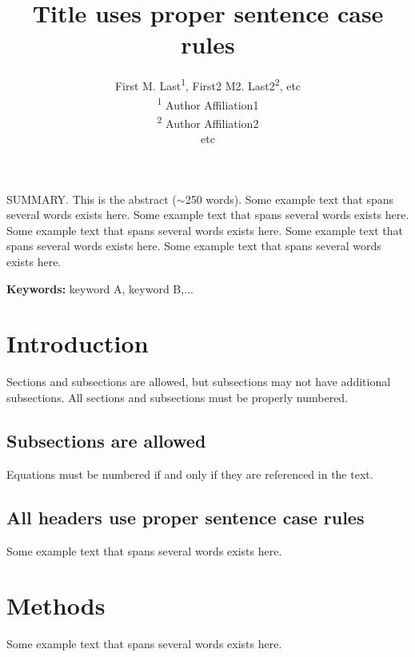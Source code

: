 \documentclass[10pt,fleqn]{article} %
\begin{document}
\title{Title uses proper sentence case rules}
\author{First M. Last\textsuperscript{1},
        First2 M2. Last2\textsuperscript{2}, 
        etc\\ 
        \textsuperscript{1} Author Affiliation1\\ 
        \textsuperscript{2} Author Affiliation2\\
        etc}


\maketitle{}

\textsc{SUMMARY. \hspace{0.1in}} This is the abstract ($\sim$250 words). Some example text that spans several words exists here.  Some example text that spans several words exists here.  Some example text that spans several words exists here.  Some example text that spans several words exists here.  Some example text that spans several words exists here. 

{\bf Keywords:} keyword A, keyword B,...

\section*{Introduction}

Sections and subsections are allowed, but subsections may not have additional subsections. All sections and subsections must be properly numbered.

\subsection*{Subsections are allowed}

 Equations must be numbered if and only if they are referenced in the text.  
 
\subsection*{All headers use proper sentence case rules}

 Some example text that spans several words exists here.  

\section*{Methods}

 Some example text that spans several words exists here.  
 
\end{document}
